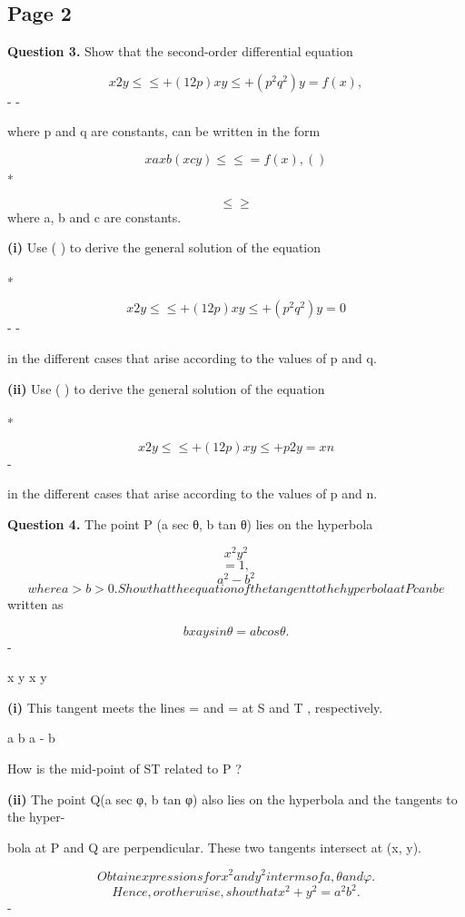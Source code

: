 \documentclass[12pt]{article}
\begin{document}
\subsection*{Page 2}
\begin{flushleft}
\bigskip\textbf{Question 3.} Show that the second-order differential equation\par
\[x2y \leq\leq + (1 2p)x y \leq + (p^2 q^2) y = f(x) ,\]
- -\par
where p and q are constants, can be written in the form\par
\[xa xb(xcy) \leq \leq = f(x) , ( )\]
∗\par
\[\leq \geq\]
where a, b and c are constants.\par
\textbf{(i)} Use ( ) to derive the general solution of the equation\par
∗\par
\[x2y \leq\leq + (1 2p)xy \leq + (p^2 q^2)y = 0\]
- -\par
in the different cases that arise according to the values of p and q.\par
\textbf{(ii)} Use ( ) to derive the general solution of the equation\par
∗\par
\[x2y \leq\leq + (1 2p)xy \leq + p2y = xn\]
-\par
in the different cases that arise according to the values of p and n.\par
\bigskip\textbf{Question 4.} The point P (a sec θ, b tan θ) lies on the hyperbola\par
\[x^2 y^2\]
\[= 1 ,\]
\[a^2 - b^2\]
\[where a > b > 0 . Show that the equation of the tangent to the hyperbola at P can be\]
written as\par
\[bx ay sin θ = ab cos θ .\]
-\par
x y x y\par
\textbf{(i)} This tangent meets the lines = and = at S and T , respectively.\par
a b a - b\par
How is the mid-point of ST related to P ?\par
\textbf{(ii)} The point Q(a sec φ, b tan φ) also lies on the hyperbola and the tangents to the hyper-\par
bola at P and Q are perpendicular. These two tangents intersect at (x, y).\par
\[Obtain expressions for x^2 and y^2 in terms of a, θ and φ.\]
\[Hence, or otherwise, show that x^2 + y^2 = a^2 b^2.\]
-\par
\end{flushleft}
\end{document}
